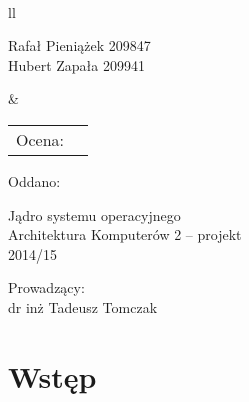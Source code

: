 \documentclass[a4paper,12pt]{article}
\begin{document}
\thispagestyle{empty}

\noindent
\unitlength=1mm
\fboxrule=1mm
\setlength{\fboxrule}{3pt}\\[+2mm]
\begin{tabular}{ll}
\begin{minipage}[t]{110mm}
{\LARGE\sf 
Rafał Pieniążek 209847\\
Hubert Zapała  209941}
\end{minipage}
 &
\begin{minipage}[t]{55mm}
{\Large\sf 
\begin{tabular}{ll}
Ocena:  & \raisebox{-3mm}{\framebox(20,9)[cc]{}}\\
\end{tabular}
}
\end{minipage}
\end{tabular}

\hfill {\Large\sf Oddano: }\\[+10mm]

\begin{center}
{\huge\sf Jądro systemu operacyjnego}\\[+10mm]
{\Large\sc 
Architektura Komputerów 2 -- projekt\\
2014/15\\[+10mm]}
\end{center}

\noindent
{\sc 
\hspace*{70mm}Prowadz\k{a}cy:\\
\hspace*{70mm}dr inż Tadeusz Tomczak\\
}

\newpage
\tableofcontents %
\newpage
	
	\section{Wstęp}
\end{document}
